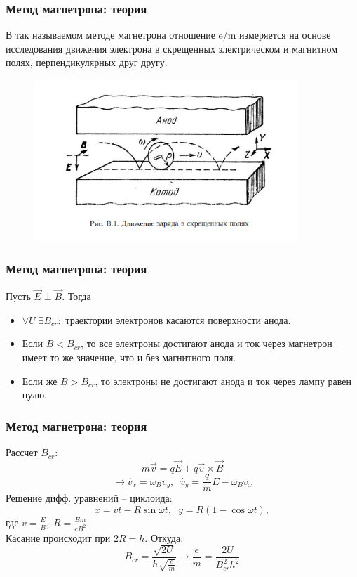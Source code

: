 \documentclass{beamer}
\begin{document}
\begin{frame}
\frametitle{Метод магнетрона: теория}
В так называемом методе магнетрона отношение e/m измеряется на
основе исследования движения электрона в скрещенных электрическом и магнитном полях, перпендикулярных друг другу.
\begin{figure}
	\includegraphics[width=10cm]{ris2.PNG}
	\label{ris:ris2}
\end{figure}

\end{frame}
\begin{frame}
\frametitle{Метод магнетрона: теория}
Пусть $\Vec{E} \perp \Vec{B}.$  Тогда 
\begin{itemize}
    \item $\forall U\; \exists B_{cr}: $ траектории электронов касаются поверхности анода.\\
    \item Если $B < B_{cr}$, то все электроны
достигают анода и ток через магнетрон имеет то же значение, что и без
магнитного поля.\\
    \item Если же $B > B_{cr}$, то электроны не достигают анода и
ток через лампу равен нулю.\\

\end{itemize}
\end{frame}

\begin{frame}
\frametitle{Метод магнетрона: теория}
Рассчет $B_{cr}:$
\begin{equation}
    m\dot{\Vec{v}} = q\Vec{E} + q\Vec{v} \times \Vec{B}
\end{equation}
\begin{equation}
    \longrightarrow \dot{v_x} = \omega_B v_y,\;\;\dot{v_y} = \frac{q}{m}E - \omega_B v_x
\end{equation}
Решение дифф. уравнений -- циклоида:
\begin{equation}
    x = vt - R \sin{\omega t},\;\; y = R(1 - \cos{\omega t}),
\end{equation}
где $v = \frac{E}{B},\; R = \frac{Em}{eB^2}.$ \\
Касание происходит при $2R = h$. Откуда:
\begin{equation}
    B_{cr} = \frac{\sqrt{2U}}{h\sqrt{\frac{e}{m}}} \longrightarrow \frac{e}{m} = \frac{2U}{B_{cr}^2 h^2}
\end{equation}
\end{frame}
\end{document}
